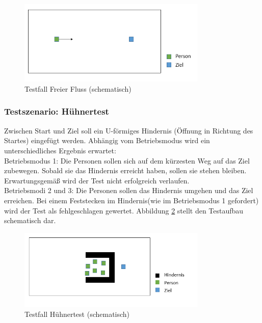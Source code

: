 \begin{figure}[htpb]
	\centering
	\includegraphics[width=0.8\textwidth]{abbildungen/Test_FreierFluss.png}
	\caption{Testfall Freier Fluss (schematisch)}
	\label{fig:AnforderungenTest_FreierFluss}
\end{figure}

\subsubsection{Testszenario: Hühnertest}
Zwischen Start und Ziel soll ein U-förmiges Hindernis (Öffnung in Richtung des Startes) eingefügt werden. Abhängig vom Betriebsmodus wird ein unterschiedliches Ergebnis erwartet:\\
Betriebsmodus 1: Die Personen sollen sich auf dem kürzesten Weg auf das Ziel zubewegen. Sobald sie das Hindernis erreicht haben, sollen sie stehen bleiben. Erwartungsgemäß wird der Test nicht erfolgreich verlaufen. \\
Betriebsmodi 2 und 3: Die Personen sollen das Hindernis umgehen und das Ziel erreichen. Bei einem \glqq Feststecken im Hindernis\grqq (wie im Betriebsmodus 1 gefordert) wird der Test als fehlgeschlagen gewertet. Abbildung \ref{fig:AnforderungenTest_Hühner} stellt den Testaufbau schematisch dar.

\begin{figure}[htpb]
	\centering
	\includegraphics[width=0.8\textwidth]{abbildungen/Test_Huehner.png}
	\caption{Testfall Hühnertest (schematisch)}
	\label{fig:AnforderungenTest_Hühner}
\end{figure}
 

